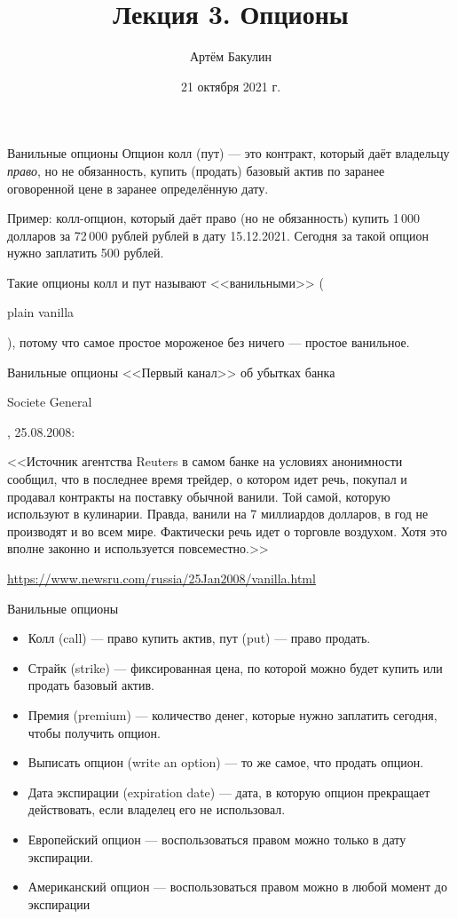 \documentclass{beamer}
\title{Лекция 3. Опционы}
\author{Артём Бакулин}
\date{21 октября 2021 г.}
\newcommand{\en}[1]{\begin{otherlanguage}{english}#1\end{otherlanguage}}
\begin{document}
\begin{frame}
\titlepage
\end{frame}



\begin{frame}{Ванильные опционы}
\justifying
\alert{Опцион колл (пут)} --- это контракт, который даёт владельцу \textit{право}, но не обязанность, купить (продать) базовый актив по заранее оговоренной цене в заранее определённую дату. 

\justify
Пример: колл-опцион, который даёт право (но не обязанность) купить 1\,000 долларов за 72\,000 рублей рублей в дату 15.12.2021. Сегодня за такой опцион нужно заплатить 500 рублей.

\justify
Такие опционы колл и пут называют <<ванильными>> (\en{plain vanilla}), потому что самое простое мороженое без ничего --- простое ванильное.
\end{frame}



\begin{frame}{Ванильные опционы}
\justify
<<Первый канал>> об убытках банка \en{Societe General}, 25.08.2008:

\justify
<<Источник агентства Reuters в самом банке на условиях анонимности сообщил, что в последнее время трейдер, о котором идет речь, покупал и продавал контракты на поставку обычной ванили. \alert{Той самой, которую используют в кулинарии}. Правда, ванили на 7 миллиардов долларов, в год не производят и во всем мире. Фактически речь идет о торговле воздухом. Хотя это вполне законно и используется повсеместно.>>

\justify
\url{https://www.newsru.com/russia/25Jan2008/vanilla.html}

\end{frame}



\begin{frame}{Ванильные опционы}
\justifying
\begin{itemize}
\item Колл (call) --- право купить актив, пут (put) --- право продать.
\item Страйк (strike) --- фиксированная цена, по которой можно будет купить или продать базовый актив.
\item Премия (premium) --- количество денег, которые нужно заплатить сегодня, чтобы получить опцион.
\item Выписать опцион (write an option) --- то же самое, что продать опцион.
\item Дата экспирации (expiration date) --- дата, в которую опцион прекращает действовать, если владелец его не использовал.
\item Европейский опцион --- воспользоваться правом можно только в дату экспирации.
\item Американский опцион --- воспользоваться правом можно в любой момент до экспирации
\end{itemize}
\end{frame}
\end{document}

